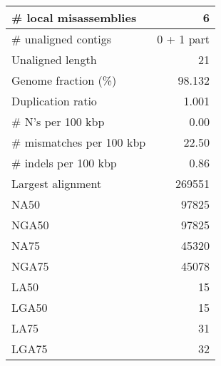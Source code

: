 \documentclass[12pt,a4paper]{article}
\begin{document}
\begin{table}[ht]
\begin{center}
\begin{tabular}{|l*{1}{|r}|}
\# local misassemblies & 6 \\ \hline
\# unaligned contigs & 0 + 1 part \\ \hline
Unaligned length & 21 \\ \hline
Genome fraction (\%) & 98.132 \\ \hline
Duplication ratio & 1.001 \\ \hline
\# N's per 100 kbp & 0.00 \\ \hline
\# mismatches per 100 kbp & 22.50 \\ \hline
\# indels per 100 kbp & 0.86 \\ \hline
Largest alignment & 269551 \\ \hline
NA50 & 97825 \\ \hline
NGA50 & 97825 \\ \hline
NA75 & 45320 \\ \hline
NGA75 & 45078 \\ \hline
LA50 & 15 \\ \hline
LGA50 & 15 \\ \hline
LA75 & 31 \\ \hline
LGA75 & 32 \\ \hline
\end{tabular}
\end{center}
\end{table}
\end{document}
